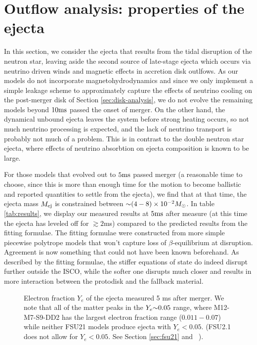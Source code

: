\section{Outflow analysis: properties of the ejecta}
\label{sec:tail-analysis}

In this section, we consider the ejecta that results from the tidal disruption of the neutron star, leaving aside the second source of late-stage ejecta which occurs via neutrino driven winds and magnetic effects in accretion disk outlfows.  
As our models do not incorporate magnetohydrodynamics and since we only implement a simple leakage scheme to approximately capture the effects of neutrino cooling on the post-merger disk of Section \ref{sec:disk-analysis}, we do not evolve the remaining models beyond $10 {\rm ms}$ passed the onset of merger.
On the other hand, the dynamical unbound ejecta leaves the system before strong heating occurs, so not much neutrino processing is expected, and the lack of neutrino transport is probably not much of a problem.
This is in contrast to the double neutron star ejecta, where effects of neutrino absorbtion on ejecta composition is known to be large.

For those models that evolved out to $5 {\rm ms}$ passed merger 
(a reasonable time to choose, since this is more than enough time for the motion to become ballistic and reported quantities to settle from the ejecta),
we find that at that time, the ejecta mass $M_{\rm ej}$ is constrained between $\mathord{\sim} (4 - 8) \times 10^{-2} M_\odot$.
In table \ref{tab:results}, we display our measured results at $5 {\rm ms}$ after measure (at this time the ejecta has leveled off for $\gtrsim 2$ms) compared to the predicted results from the fitting formulae.
The fitting formulae were constructed from more simple piecewise polytrope models that won't capture loss of $\beta$-equilibrium at disruption.
Agreement is now something that could not have been known beforehand.
As described by the fitting formulae, the stiffer equations of state do indeed disrupt further outside the ISCO, while the softer one disrupts much closer and results in more interaction between the protodisk and the fallback material.


\begin{figure}
	\centering
	
	\caption[Composition of the ejecta]{
		Electron fraction $Y_e$ of the ejecta measured 5 ms after merger.  
		We note that all of the matter peaks in the $Y_e \mathord{\sim} 0.05$ range, where M12-M7-S9-DD2 has the largest electron fraction range ($0.011 - 0.07$) while neither FSU21 models produce ejecta with $Y_e < 0.05$. 
		(FSU2.1 does not allow for $Y_e < 0.05$.  See Section \ref{sec:fsu21} and ~\cite{shen2011second}).
	}
	\label{fig:Yehisto}
\end{figure}


